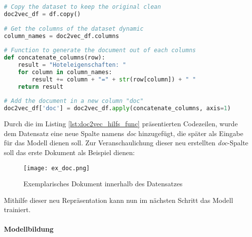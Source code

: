 \begin{lstlisting}[language=Python, label=lst:doc2vec_hilfs_func, caption=Hilfsfunktion zur Erzeugung von textbasierten Dokumenten]
# Copy the dataset to keep the original clean
doc2vec_df = df.copy()
    
# Get the columns of the dataset dynamic
column_names = doc2vec_df.columns
    
# Function to generate the document out of each columns
def concatenate_columns(row):
    result = "Hoteleigenschaften: "
    for column in column_names:
        result += column + "=" + str(row[column]) + " "
    return result
    
# Add the document in a new column "doc"
doc2vec_df['doc'] = doc2vec_df.apply(concatenate_columns, axis=1)
\end{lstlisting}

Durch die im Listing \ref{lst:doc2vec_hilfs_func} präsentierten Codezeilen, wurde dem Datensatz eine neue Spalte namens \emph{doc} hinzugefügt, die später als Eingabe für das Modell dienen soll. Zur Veranschaulichung dieser neu erstellten \emph{doc}-Spalte soll das erste Dokument als Beispiel dienen:

\begin{figure}[h]
    \centering
    \texttt{[image: ex\_doc.png]}
    \caption[Exemplarisches Dokument innerhalb des Datensatzes]{Exemplarisches Dokument innerhalb des Datensatzes}
    \label{img:ex_doc}
\end{figure}

Mithilfe dieser neu Repräsentation kann nun im nächsten Schritt das Modell trainiert.

\paragraph{Modellbildung}

